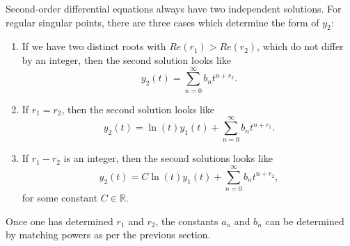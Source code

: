 \documentclass[12pt]{book}
\begin{document}
Second-order differential equations always have two independent
solutions.  For regular singular points, there are three cases which
determine the form of $y_2$:
\begin{enumerate}
\item
  If we have two distinct roots with $Re(r_1) > Re(r_2)$, which do not
  differ by an integer, then the second solution looks like
  \begin{dmath*}
    \boxed{y_2(t) = \sum_{n=0}^\infty b_n t^{n+r_2}}.
  \end{dmath*}
  \item
    If $r_1=r_2$, then the second solution looks like
    \begin{dmath*}
      \boxed{y_2(t) = \ln(t) y_1(t) + \sum_{n=0}^\infty b_n t^{n+r_1}}.
    \end{dmath*}
  \item
    If $r_1-r_2$ is an integer, then the second solutions looks like
    \begin{dmath*}
      \boxed{y_2(t) = C\ln(t) y_1(t) + \sum_{n=0}^\infty b_n t^{n+r_2}},
    \end{dmath*}
    for some constant $C\in\mathbb{R}$.
\end{enumerate}
Once one has determined $r_1$ and $r_2$, the constants $a_n$ and $b_n$ can
be determined by matching powers as per the previous section.
\end{document}
